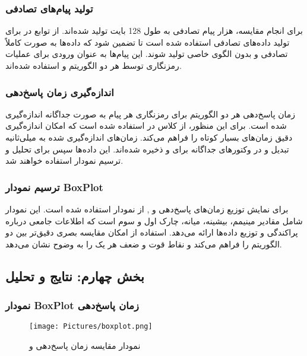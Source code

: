 \documentclass{report}
\begin{document}
\subsubsection*{تولید پیام‌های تصادفی}
برای انجام مقایسه، هزار پیام تصادفی به طول 128 بایت تولید شده‌اند. از توابع  در  برای تولید داده‌های تصادفی استفاده شده است تا تضمین شود که داده‌ها به صورت کاملاً تصادفی و بدون الگوی خاصی تولید شوند. این پیام‌ها به عنوان ورودی برای عملیات رمزنگاری توسط هر دو الگوریتم  و  استفاده شده‌اند.

\subsubsection*{اندازه‌گیری زمان پاسخ‌دهی}
زمان پاسخ‌دهی هر دو الگوریتم برای رمزنگاری هر پیام به صورت جداگانه اندازه‌گیری شده است. برای این منظور، از کلاس  در  استفاده شده است که امکان اندازه‌گیری دقیق زمان‌های بسیار کوتاه را فراهم می‌کند. زمان‌های اندازه‌گیری شده به میلی‌ثانیه تبدیل و در وکتورهای جداگانه برای  و  ذخیره شده‌اند. این داده‌ها سپس برای تحلیل و ترسیم نمودار  استفاده خواهند شد.

\subsubsection*{ترسیم نمودار BoxPlot}
برای نمایش توزیع زمان‌های پاسخ‌دهی  و , از نمودار  استفاده شده است. این نمودار شامل مقادیر مینیمم، بیشینه، میانه، چارک اول و سوم است که اطلاعات جامعی درباره پراکندگی و توزیع داده‌ها ارائه می‌دهد. استفاده از  امکان مقایسه بصری دقیق‌تر بین دو الگوریتم را فراهم می‌کند و نقاط قوت و ضعف هر یک را به وضوح نشان می‌دهد.

\subsection*{بخش چهارم: نتایج و تحلیل}

\subsubsection*{نمودار BoxPlot زمان پاسخ‌دهی}
\begin{figure}[H]
    \centering
    \texttt{[image: Pictures/boxplot.png]} 
    \caption{نمودار  مقایسه زمان پاسخ‌دهی  و }
    \label{fig:boxplot}
\end{figure}
\end{document}
